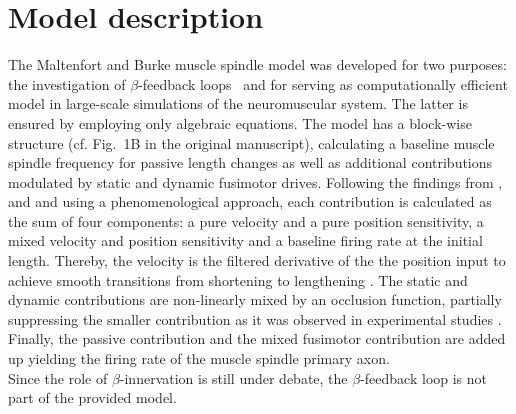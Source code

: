 \documentclass[fleqn,10pt]{physiome}
\begin{document}



\section{Model description}
The Maltenfort and Burke muscle spindle model was developed for two purposes: the investigation  of $\beta$-feedback loops~\citep{burke1977} and for serving as computationally efficient model in large-scale simulations of the neuromuscular system.  
The latter is ensured by employing only algebraic equations. 
The model has a block-wise structure (cf. Fig.~1B in the original manuscript), calculating a baseline muscle spindle frequency for passive length changes as well as additional contributions modulated by static and dynamic fusimotor drives. Following the findings from \citet{andersson1968}, \citet{lennerstrand1968b,lennerstrand1968c} and \citet{lennerstrand1968a} and using a phenomenological approach, each contribution is calculated as the sum of four components: a pure velocity and a pure position sensitivity, a mixed velocity and position sensitivity and a baseline firing rate at the initial length.
Thereby, the velocity is the filtered derivative of the the position input to achieve smooth transitions from shortening to lengthening \citep[cf.][Eqn. 3]{maltenfort2003}.  
The static and dynamic contributions are non-linearly mixed by an occlusion function, partially suppressing the smaller contribution as it was observed in experimental studies \citep{schafer1974}.
Finally, the passive contribution and the mixed fusimotor contribution are added up yielding the firing rate of the muscle spindle primary axon. \\
Since the role of $\beta$-innervation is still under debate, the $\beta$-feedback loop is not part of the provided model.  
\end{document}
